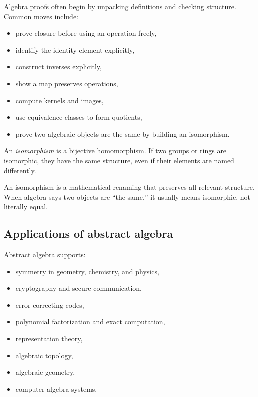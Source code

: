 Algebra proofs often begin by unpacking definitions and checking structure.
Common moves include:

\begin{itemize}
\item prove closure before using an operation freely,
\item identify the identity element explicitly,
\item construct inverses explicitly,
\item show a map preserves operations,
\item compute kernels and images,
\item use equivalence classes to form quotients,
\item prove two algebraic objects are the same by building an isomorphism.
\end{itemize}

\begin{definition}
An \emph{isomorphism} is a bijective homomorphism. If two groups or rings are
isomorphic, they have the same structure, even if their elements are named
differently.
\end{definition}

\begin{focusbox}
An isomorphism is a mathematical renaming that preserves all relevant structure.
When algebra says two objects are ``the same,'' it usually means isomorphic, not
literally equal.
\end{focusbox}

\subsection{Applications of abstract algebra}

Abstract algebra supports:

\begin{itemize}
\item symmetry in geometry, chemistry, and physics,
\item cryptography and secure communication,
\item error-correcting codes,
\item polynomial factorization and exact computation,
\item representation theory,
\item algebraic topology,
\item algebraic geometry,
\item computer algebra systems.
\end{itemize}

